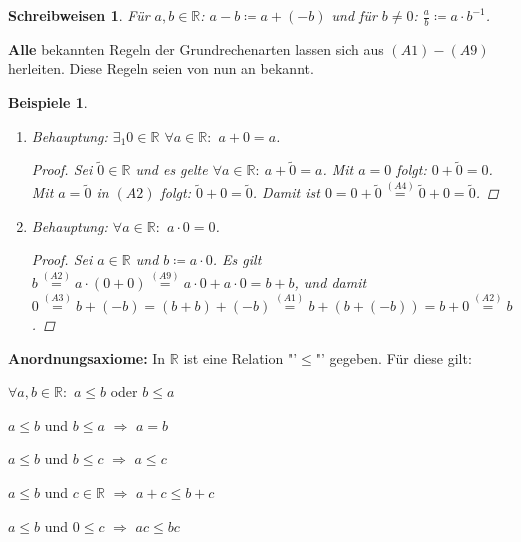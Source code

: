 \documentclass[12pt]{extreport} %
\newcommand{\R}{\mathbb{R}}
\theoremstyle{named}
\theoremstyle{itshape}
\theoremstyle{normal}
\newtheorem*{beispiele}{Beispiele}
\newtheorem*{schreibweisen}{Schreibweisen}
\begin{document}
\begin{schreibweisen}
	Für $a, b \in \R$: $a - b \coloneqq a + (-b)$ und für $b \neq 0$: $ \frac{a}{b} \coloneqq a \cdot b^{-1}$.
\end{schreibweisen}


\textbf{Alle} bekannten Regeln der Grundrechenarten lassen sich aus $(A1)-(A9)$ herleiten. Diese Regeln seien von nun an bekannt.


\begin{beispiele} ~\
	\begin{enumerate}
		\item Behauptung: $\exists_{1} 0 \in  \R$ $\forall a \in \R:$ $a + 0 = a$.
		  \begin{proof}
			Sei $\tilde{0} \in \R$ und es gelte $\forall a \in \R: \: a + \tilde{0} = a$. Mit $a = 0$ folgt: $0 + \tilde{0} = 0$. Mit $a = \tilde{0}$ in $(A2)$ folgt: 
			$\tilde{0} + 0 = \tilde{0}$. Damit ist $0 = 0 + \tilde{0} \overset{(A4)}{=} \tilde{0} + 0 = \tilde{0}$.
		  \end{proof}
		 \item Behauptung: $\forall a \in \R:$ $a \cdot 0 = 0$.
		   \begin{proof}
		      Sei $a \in \R$ und $b \coloneqq a \cdot 0$. Es gilt $b \overset{(A2)}{=} a \cdot (0 + 0) \overset{(A9)}{=} a \cdot 0 + a \cdot 0 = b + b$,
		      und damit 
		      $0 \overset{(A3)}{=} b + (-b) = (b + b) + (-b) \overset{(A1)}{=} b + (b + (-b)) = b + 0 \overset{(A2)}{=} b$.
		   \end{proof}
	\end{enumerate}
\end{beispiele}

\textbf{Anordnungsaxiome:} In $\R$ ist eine Relation "'$\leq$"' gegeben. F\"ur diese gilt:
\begin{description} \addtolength{\itemindent}{0.4cm}
	\item[$(A10)$] $\forall a, b \in \R:$ $a \leq b$ oder $b \leq a$ \label{a.axiom-a10}
	\item[$(A11)$] $a \leq b$ und $b \leq a$ $\Rightarrow$ $a = b$ \label{a.axiom-a11}
	\item[$(A12)$] $a \leq b$ und $b \leq c$ $\Rightarrow$ $a \leq c$ \label{a.axiom-a12}
	\item[$(A13)$] $a \leq b$ und $c \in \R$ $\Rightarrow$ $a + c \leq b + c$ \label{a.axiom-a13}
	\item[$(A14)$] $a \leq b$ und $0 \leq c$ $\Rightarrow$ $ac \leq b c$ \label{a.axiom-a14}
\end{description}
\end{document}
